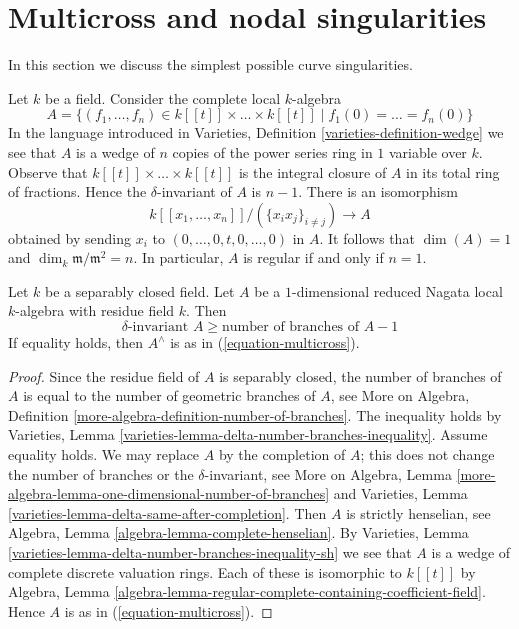 \section{Multicross and nodal singularities}
\label{section-multicross}

\noindent
In this section we discuss the simplest possible curve singularities.

\medskip\noindent
Let $k$ be a field. Consider the complete local $k$-algebra
\begin{equation}
\label{equation-multicross}
A = \{(f_1, \ldots, f_n) \in k[[t]] \times \ldots \times k[[t]] \mid
f_1(0) = \ldots = f_n(0)\}
\end{equation}
In the language introduced in
Varieties, Definition \ref{varieties-definition-wedge}
we see that $A$ is a wedge of $n$ copies of the power series
ring in $1$ variable over $k$. Observe that
$k[[t]] \times \ldots \times k[[t]]$
is the integral closure of $A$ in its total ring of fractions.
Hence the $\delta$-invariant of $A$ is $n - 1$.
There is an isomorphism
$$
k[[x_1, \ldots, x_n]]/(\{x_ix_j\}_{i \not = j}) \longrightarrow A
$$
obtained by sending $x_i$ to $(0, \ldots, 0, t, 0, \ldots, 0)$
in $A$. It follows that $\dim(A) = 1$ and
$\dim_k \mathfrak m/\mathfrak m^2 = n$.
In particular, $A$ is regular if and only if $n = 1$.

\begin{lemma}
\label{lemma-multicross-algebra}
Let $k$ be a separably closed field. Let $A$ be a $1$-dimensional
reduced Nagata local $k$-algebra with residue field $k$. Then
$$
\delta\text{-invariant }A \geq \text{number of branches of }A - 1
$$
If equality holds, then $A^\wedge$ is as in (\ref{equation-multicross}).
\end{lemma}

\begin{proof}
Since the residue field of $A$ is separably closed, the number
of branches of $A$ is equal to the number of geometric branches
of $A$, see
More on Algebra, Definition \ref{more-algebra-definition-number-of-branches}.
The inequality holds by
Varieties, Lemma \ref{varieties-lemma-delta-number-branches-inequality}.
Assume equality holds.
We may replace $A$ by the completion of $A$; this does
not change the number of branches or the $\delta$-invariant, see
More on Algebra, Lemma
\ref{more-algebra-lemma-one-dimensional-number-of-branches}
and Varieties, Lemma \ref{varieties-lemma-delta-same-after-completion}.
Then $A$ is strictly henselian, see
Algebra, Lemma \ref{algebra-lemma-complete-henselian}.
By Varieties, Lemma \ref{varieties-lemma-delta-number-branches-inequality-sh}
we see that $A$ is a wedge of complete discrete valuation rings.
Each of these is isomorphic to $k[[t]]$ by Algebra, Lemma
\ref{algebra-lemma-regular-complete-containing-coefficient-field}.
Hence $A$ is as in (\ref{equation-multicross}).
\end{proof}

